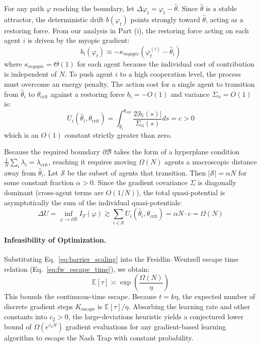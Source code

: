 For any path $\varphi$ reaching the boundary, let $\Delta \varphi_t = \varphi_t - \hat{\theta}$. Since $\hat{\theta}$ is a stable attractor, the deterministic drift $b(\varphi_t)$ points strongly toward $\hat{\theta}$, acting as a restoring force. From our analysis in Part (i), the restoring force acting on each agent $i$ is driven by the myopic gradient:
\begin{equation}
b_i(\varphi_t) \approx - \kappa_{myopic} (\varphi_t^{(i)} - \hat{\theta}_i)
\end{equation}
where $\kappa_{myopic} = \Theta(1)$ for each agent because the individual cost of contribution is independent of $N$.
To push agent $i$ to a high cooperation level, the process must overcome an energy penalty. The action cost for a single agent to transition from $\hat{\theta}_i$ to $\theta_{\mathrm{crit}}$ against a restoring force $b_i = -O(1)$ and variance $\Sigma_{ii} = O(1)$ is:
\begin{equation}
U_i(\hat{\theta}_i, \theta_{\mathrm{crit}}) = \int_{\hat{\theta}_i}^{\theta_{\mathrm{crit}}} \frac{2|b_i(s)|}{\Sigma_{ii}(s)} ds = c > 0
\end{equation}
which is an $O(1)$ constant strictly greater than zero.

Because the required boundary $\partial \mathcal{B}$ takes the form of a hyperplane condition $\frac{1}{N}\sum_i \lambda_i = \lambda_{\mathrm{crit}}$, reaching it requires moving $\Omega(N)$ agents a macroscopic distance away from $\hat{\theta}_i$. Let $\mathcal{S}$ be the subset of agents that transition. Then $|\mathcal{S}| = \alpha N$ for some constant fraction $\alpha > 0$.
Since the gradient covariance $\Sigma$ is diagonally dominant (cross-agent terms are $O(1/N)$), the total quasi-potential is asymptotically the sum of the individual quasi-potentials:
\begin{equation}
\Delta U = \inf_{\varphi \to \partial \mathcal{B}} I_T(\varphi) \gtrsim \sum_{i \in \mathcal{S}} U_i(\hat{\theta}_i, \theta_{\mathrm{crit}}) = \alpha N \cdot c = \Omega(N)
\label{eq:barrier_scaling}
\end{equation}

\paragraph{Infeasibility of Optimization.}
Substituting Eq.~\ref{eq:barrier_scaling} into the Freidlin--Wentzell escape time relation (Eq.~\ref{eq:fw_escape_time}), we obtain:
\begin{equation}
\mathbb{E}[\tau] \asymp \exp\left( \frac{\Omega(N)}{\eta} \right)
\end{equation}
This bounds the continuous-time escape. Because $t = k\eta$, the expected number of discrete gradient steps $K_{\mathrm{escape}}$ is $\mathbb{E}[\tau] / \eta$. Absorbing the learning rate and other constants into $c_2 > 0$, the large-deviations heuristic yields a conjectured lower bound of $\Omega(e^{c_2 N})$ gradient evaluations for any gradient-based learning algorithm to escape the Nash Trap with constant probability.

